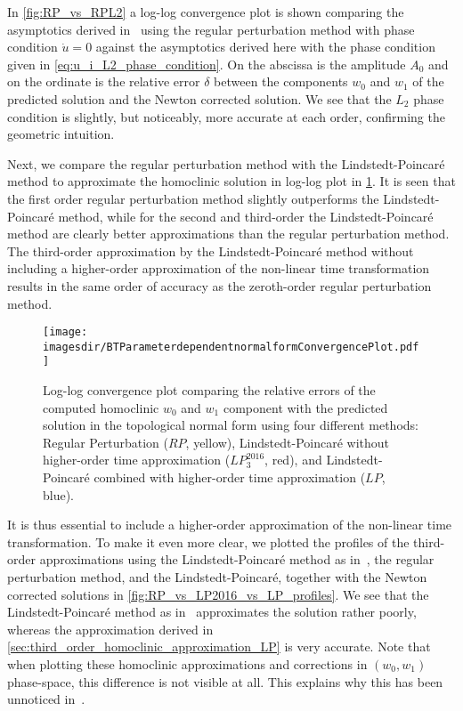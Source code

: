 In \cref{fig:RP_vs_RPL2} a log-log convergence plot is shown comparing the
asymptotics derived in~\cite{Al-Hdaibat2016} using the regular perturbation
method with phase condition $\dot u = 0$ against the asymptotics derived here
with the phase condition given in \cref{eq:u_i_L2_phase_condition}.  On the
abscissa is the amplitude $A_0$ and on the ordinate is the relative error
$\delta$ between the components $w_0$ and $w_1$ of the predicted solution and
the Newton corrected solution. We see that the $L_2$ phase condition is
slightly, but noticeably, more accurate at each order, confirming the geometric
intuition.

Next, we compare the regular perturbation method with the Lindstedt-Poincar\'e
method to approximate the homoclinic solution in log-log plot in
\cref{fig:RP_vs_LP2016_vs_LP}.  It is seen that the first order regular
perturbation method slightly outperforms the Lindstedt-Poincar\'e method, while
for the second and third-order the Lindstedt-Poincar\'e method  are clearly
better approximations than the regular perturbation method.  The third-order
approximation by the Lindstedt-Poincar\'e method without including a
higher-order approximation of the non-linear time transformation results in the
same order of accuracy as the zeroth-order regular perturbation method.

\begin{figure}
    \texttt{[image: \\imagesdir/BTParameterdependentnormalformConvergencePlot.pdf]}
    \caption{Log-log convergence plot comparing the relative errors of the computed
        homoclinic $w_0$ and $w_1$ component with the predicted solution in the
        topological normal form using four different methods: Regular
        Perturbation ($RP$, yellow), Lindstedt-Poincar\'e without higher-order time
        approximation ($LP_3^{2016}$, red), and Lindstedt-Poincar\'e combined
        with higher-order time approximation ($LP$, blue).}
    \label{fig:RP_vs_LP2016_vs_LP}
\end{figure}

It is thus essential to include a higher-order approximation of the non-linear
time transformation. To make it even more clear, we plotted the profiles of the
third-order approximations using the Lindstedt-Poincar\'e method as
in~\cite{Al-Hdaibat2016}, the regular perturbation method, and the
Lindstedt-Poincar\'e, together with the Newton corrected solutions in
\cref{fig:RP_vs_LP2016_vs_LP_profiles}. We see that the Lindstedt-Poincar\'e
method as in~\cite{Al-Hdaibat2016} approximates the solution rather poorly,
whereas the approximation derived in
\cref{sec:third_order_homoclinic_approximation_LP} is very accurate. Note that
when plotting these homoclinic approximations and corrections in $(w_0,w_1)$
phase-space, this difference is not visible at all. This explains why this has been
unnoticed in~\cite{Al-Hdaibat2016}.

